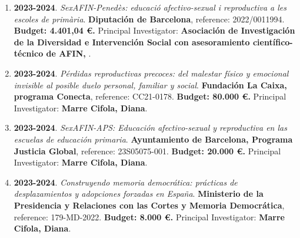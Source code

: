 \begin{enumerate}
\item {\bf 2023-2024}. {\it SexAFIN-Penedès: educació afectivo-sexual i reproductiva a les escoles de primària}. {\bf Diputación de Barcelona},  reference: 2022/0011994. {\bf  Budget: 4.401,04 €.} Principal Investigator: {\bf Asociación de Investigación de la Diversidad e Intervención Social con asesoramiento científico-técnico de AFIN, }.\filbreak
\item {\bf 2023-2024}. {\it Pérdidas reproductivas precoces: del malestar físico y emocional invisible al posible duelo personal, familiar y social}. {\bf Fundación La Caixa, programa Conecta},  reference: CC21-0178. {\bf  Budget: 80.000 €.} Principal Investigator: {\bf Marre Cifola, Diana}.\filbreak
\item {\bf 2023-2024}. {\it SexAFIN-APS: Educación afectivo-sexual y reproductiva en las escuelas de educación primaria}. {\bf Ayuntamiento de Barcelona, Programa Justicia Global},  reference: 23S05075-001. {\bf  Budget: 20.000 €.} Principal Investigator: {\bf Marre Cifola, Diana}.\filbreak
\item {\bf 2023-2024}. {\it Construyendo memoria democrática: prácticas de desplazamientos y adopciones forzadas en España}. {\bf Ministerio de la Presidencia y Relaciones con las Cortes y Memoria Democrática},  reference: 179-MD-2022. {\bf  Budget: 8.000 €.} Principal Investigator: {\bf Marre Cifola, Diana}.\filbreak
\end{enumerate} 
